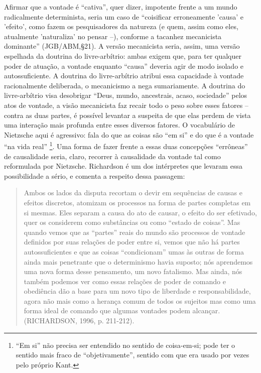 \documentclass[
	12pt,				%
	openright,			%
	oneside,			%
	a4paper,			%
	english,			%
	french,				%
	spanish,			%
	brazil				%
	]{abntex2}
\begin{document}
Afirmar que a vontade é “cativa”, quer dizer, impotente frente a um mundo radicalmente determinista, seria um caso de “coisificar erroneamente 'causa' e 'efeito', como fazem os pesquisadores da natureza (e quem, assim como eles, atualmente 'naturaliza' no pensar –), conforme a tacanhez mecanicista dominante” (JGB/ABM,§21). A versão mecanicista seria, assim, uma versão espelhada da doutrina do livre-arbítrio: ambas exigem que, para ter qualquer poder de atuação, a vontade enquanto “causa” deveria agir de modo isolado e autossuficiente. A doutrina do livre-arbítrio atribui essa capacidade à vontade racionalmente deliberada, o mecanicismo a nega sumariamente. A doutrina do livre-arbítrio visa desobrigar “Deus, mundo, ancestrais, acaso, sociedade” pelos atos de vontade, a visão mecanicista faz recair todo o peso sobre esses fatores – contra as duas partes, é possível levantar a suspeita de que elas perdem de vista uma interação mais profunda entre esses diversos fatores. O vocabulário de Nietzsche aqui é agressivo: fala do que as coisas são “em si” e do que é a vontade “na vida real”
\footnote{“Em si” não precisa ser entendido no sentido de coisa-em-si; pode ter o sentido mais fraco de “objetivamente”, sentido com que era usado por vezes pelo próprio Kant.}. Uma forma de fazer frente a essas duas concepções “errôneas” de causalidade seria, claro, recorrer à causalidade da vontade tal como reformulada por Nietzsche. Richardson é um dos intérpretes que levaram essa possibilidade a sério, e comenta a respeito dessa passagem:

\begin{quotation}
Ambos os lados da disputa recortam o devir em sequências de causas e efeitos discretos, atomizam os processos na forma de partes completas em si mesmas. Eles separam a causa do ato de causar, o efeito do ser efetivado, quer os considerem como substâncias ou como “estado de coisas”. Mas quando vemos que as “partes” reais do mundo são processos de vontade definidos por suas relações de poder entre si, vemos que não há partes autossuficientes e que as coisas “condicionam” umas às outras de forma ainda mais penetrante que o determinismo havia suposto; nós aprendemos uma nova forma desse pensamento, um novo fatalismo. Mas ainda, nós também podemos ver como essas relações de poder de comando e obediência dão a base para um novo tipo de liberdade e responsabilidade, agora não mais como a herança comum de todos os sujeitos mas como uma forma ideal de comando que algumas vontades podem alcançar. (RICHARDSON, 1996, p. 211-212).
\end{quotation}
\end{document}
